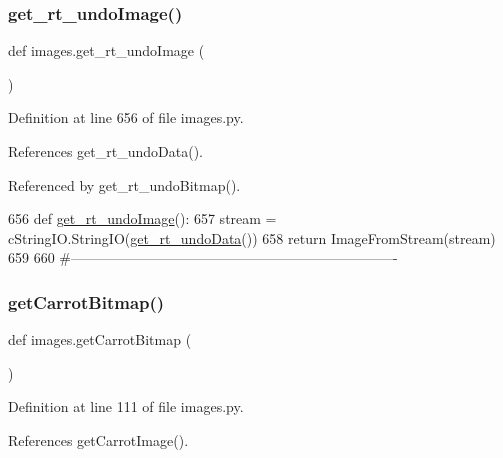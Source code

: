 \mbox{\label{namespaceimages_a7aac75ffcce6d5a3ebe9637e743169c7}} 
\subsubsection{\texorpdfstring{get\+\_\+rt\+\_\+undo\+Image()}{get\_rt\_undoImage()}}
{\footnotesize\ttfamily def images.\+get\+\_\+rt\+\_\+undo\+Image (\begin{DoxyParamCaption}{ }\end{DoxyParamCaption})}



Definition at line 656 of file images.\+py.



References get\+\_\+rt\+\_\+undo\+Data().



Referenced by get\+\_\+rt\+\_\+undo\+Bitmap().


\begin{DoxyCode}
656 \textcolor{keyword}{def }\hyperlink{namespaceimages_a7aac75ffcce6d5a3ebe9637e743169c7}{get\_rt\_undoImage}():
657     stream = cStringIO.StringIO(\hyperlink{namespaceimages_a9c965a0dce12c259b4545a995e0c4b73}{get\_rt\_undoData}())
658     \textcolor{keywordflow}{return} ImageFromStream(stream)
659 
660 \textcolor{comment}{#----------------------------------------------------------------------}
\end{DoxyCode}
\mbox{\label{namespaceimages_a1f0f3db4c047cc2a3a3f1de039b9cbd2}} 
\subsubsection{\texorpdfstring{get\+Carrot\+Bitmap()}{getCarrotBitmap()}}
{\footnotesize\ttfamily def images.\+get\+Carrot\+Bitmap (\begin{DoxyParamCaption}{ }\end{DoxyParamCaption})}



Definition at line 111 of file images.\+py.



References get\+Carrot\+Image().


